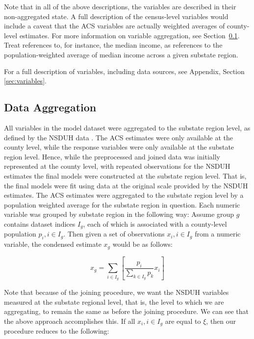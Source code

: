 \documentclass{article}
\begin{document}
Note that in all of the above descriptions, the variables are described in their
non-aggregated state. A full description of the census-level variables would
include a caveat that the ACS variables are actually weighted averages of
county-level estimates. For more information on variable aggregation, see
Section~\ref{sec:aggregation}. Treat references to, for instance, the
median income, as references to the population-weighted average of
median income across a given substate region.

For a full description of variables, including data sources, see
Appendix, Section \ref{sec:variables}.

\subsection{Data Aggregation}\label{sec:aggregation}

All variables in the model dataset were aggregated to the substate region level,
as defined by the NSDUH data \cite{samhsa_substate_region_defs}.
The ACS estimates were only available at the county level,
while the response variables were only available at the substate region level.
Hence, while the preprocessed and joined data was
initially represented at the county level,
with repeated observations for the NSDUH estimates
the final models were constructed at the substate region level.
That is, the final models were fit using data at the original
scale provided by the NSDUH estimates.
The ACS estimates were aggregated to the substate region level
by a population weighted average for the substate region in question.
Each numeric variable was grouped by substate region
in the following way:
Assume group $g$ contains dataset indices $I_g$,
each of which is associated with a county-level population
$p_{i}, i \in I_g$.
Then given a set of observations $x_{i}, i \in I_g$
from a numeric variable,
the condensed estimate $x_g$ would be as follows:

\begin{equation*}
    x_g = \sum_{i \in I_g}
    \left[ \frac{p_{i}}{\sum_{k \in I_g} p_{k}} x_i \right]
\end{equation*}

Note that because of the joining procedure,
we want the NSDUH variables measured at the substate regional level,
that is, the level to which we are aggregating,
to remain the same as before the joining procedure.
We can see that the above approach accomplishes this.
If all $x_i, i \in I_g$ are equal to $\xi$,
then our procedure reduces to the following:
\end{document}

